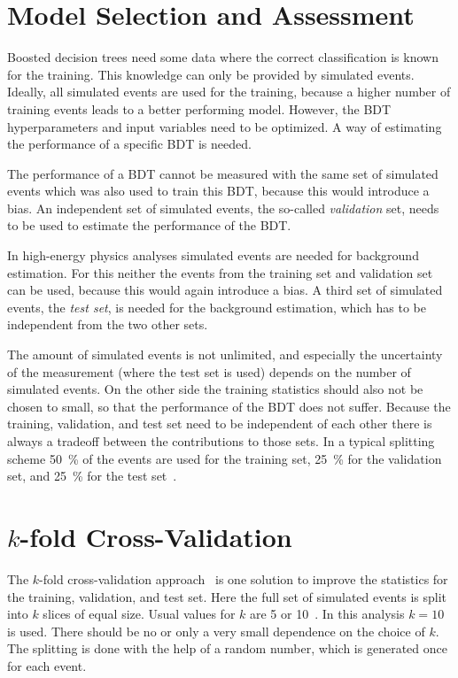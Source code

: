 \section{Model Selection and Assessment}\label{sec:mva:sets}

Boosted decision trees need some data where the correct classification is known for the training.
This knowledge can only be provided by simulated events.
Ideally, all simulated events are used for the training, because a higher number of training events
leads to a better performing model.
However, the BDT hyperparameters and input variables need to be optimized.
A way of estimating the performance of a specific BDT is needed.

The performance of a BDT cannot be measured with the same set of simulated events which was also used
to train this BDT, because this would introduce a bias.
An independent set of simulated events, the so-called \emph{validation} set, needs to be used to estimate
the performance of the BDT\@.

In high-energy physics analyses simulated events are needed for background estimation.
For this neither the events from the training set and validation set can be used, because this would again
introduce a bias.
A third set of simulated events, the \emph{test set}, is needed for the background estimation,
which has to be independent from the two other sets.

The amount of simulated events is not unlimited, and especially the uncertainty of the measurement (where the test set is used)
depends on the number of simulated events.
On the other side the training statistics should also not be chosen to small, so that the performance of the BDT
does not suffer.
Because the training, validation, and test set need to be independent of each other there is always a tradeoff
between the contributions to those sets.
In a typical splitting scheme \SI{50}{\percent} of the events are used for the training set, \SI{25}{\percent} for the validation set, and
\SI{25}{\percent} for the test set~\cite{Hastie2009}.

\section{$k$-fold Cross-Validation}\label{sec:mva:kfold-xval}

The $k$-fold cross-validation approach~\cite{Hastie2009} is one solution to improve the statistics for the training, validation, and
test set.
Here the full set of simulated events is split into $k$ slices of equal size.
Usual values for $k$ are 5 or 10~\cite{Hastie2009}.
In this analysis $k=10$ is used.
There should be no or only a very small dependence on the choice of $k$.
The splitting is done with the help of a random number, which is generated once for each event.

